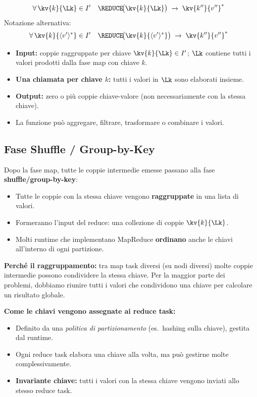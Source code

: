 \begin{definizione}
  \[
    \forall\, \kv{k}{\Lk} \in I' \quad
    \REDUCE\!\bigl(\kv{k}{\Lk}\bigr) \;\to\; \kv{k''}{v''}^{*}
  \]
  Notazione alternativa:
  \[
    \forall\, \kv{k}{\langle v'\rangle^{*}} \in I' \quad
    \REDUCE\!\bigl(\kv{k}{\langle v'\rangle^{*}}\bigr) \;\to\; \kv{k''}{v''}^{*}
  \]
  \begin{itemize}
    \item \textbf{Input:} coppie raggruppate per chiave $\kv{k}{\Lk} \in I'$;
      $\Lk$ contiene tutti i valori prodotti dalla fase map con chiave $k$.
    \item \textbf{Una chiamata per chiave $k$:} tutti i valori in $\Lk$ sono
      elaborati insieme.
    \item \textbf{Output:} zero o più coppie chiave-valore
      (non necessariamente con la stessa chiave).
    \item La funzione può aggregare, filtrare, trasformare o combinare i valori.
  \end{itemize}
\end{definizione}

\subsection{Fase Shuffle / Group-by-Key}

Dopo la fase map, tutte le coppie intermedie emesse passano alla fase
\textbf{shuffle/group-by-key}:
\begin{itemize}
  \item Tutte le coppie con la stessa chiave vengono \textbf{raggruppate}
    in una lista di valori.
  \item Formeranno l'input del reduce: una collezione di coppie
    $\kv{k}{\Lk}$.
  \item Molti runtime che implementano MapReduce \textbf{ordinano}
    anche le chiavi all'interno di ogni partizione.
\end{itemize}

\textbf{Perché il raggruppamento:} tra map task diversi (su nodi diversi)
molte coppie intermedie possono condividere la stessa chiave. Per la maggior
parte dei problemi, dobbiamo riunire tutti i valori che condividono una chiave
per calcolare un risultato globale.

\textbf{Come le chiavi vengono assegnate ai reduce task:}
\begin{itemize}
  \item Definito da una \emph{politica di partizionamento} (es.\ hashing
    sulla chiave), gestita dal runtime.
  \item Ogni reduce task elabora una chiave alla volta, ma può gestirne
    molte complessivamente.
  \item \textbf{Invariante chiave:} tutti i valori con la stessa chiave
    vengono inviati allo stesso reduce task.
\end{itemize}

